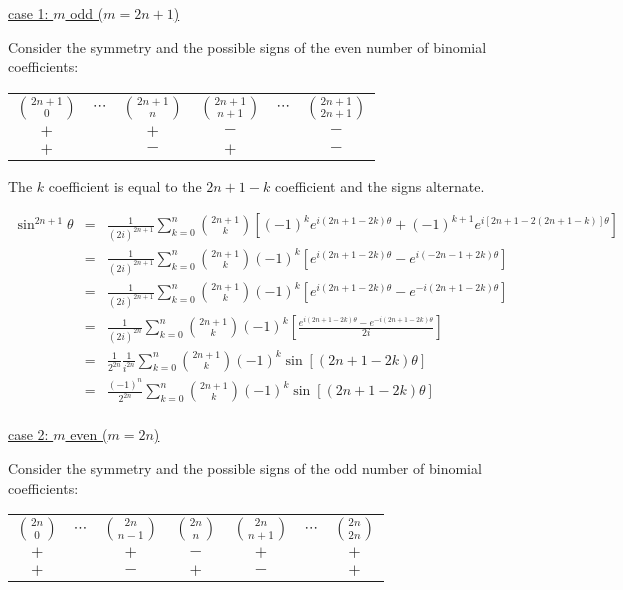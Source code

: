 \documentclass[letterpaper,12pt,fleqn]{article}
\renewcommand{\o}{\theta}
\begin{document}
\begin{theproof}
\begin{description}
\item{\underline{case 1: $m$ odd ($m=2n+1$)}}

Consider the symmetry and the possible signs of the even number of binomial
coefficients:

\begin{tabular}{cccccc}
$\binom{2n+1}{0}$ & $\cdots$ & $\binom{2n+1}{n}$ &
    $\binom{2n+1}{n+1}$ & $\cdots$ & $\binom{2n+1}{2n+1}$ \\
$+$ & & $+$ & $-$ & & $-$ \\
$+$ & & $-$ & $+$ & & $-$ \\
\end{tabular}

The $k$ coefficient is equal to the $2n+1-k$ coefficient and the signs
alternate.

\begin{eqnarray*}
\sin^{2n+1}\o &=& \frac{1}{(2i)^{2n+1}}\sum_{k=0}^n\binom{2n+1}{k}
        \left[(-1)^ke^{i(2n+1-2k)\o}+(-1)^{k+1}e^{i[2n+1-2(2n+1-k)]\o}\right] \\
    &=&  \frac{1}{(2i)^{2n+1}}\sum_{k=0}^n\binom{2n+1}{k}(-1)^k
        \left[e^{i(2n+1-2k)\o}-e^{i(-2n-1+2k)\o}\right] \\
    &=& \frac{1}{(2i)^{2n+1}}\sum_{k=0}^n\binom{2n+1}{k}(-1)^k
        \left[e^{i(2n+1-2k)\o}-e^{-i(2n+1-2k)\o}\right] \\
    &=& \frac{1}{(2i)^{2n}}\sum_{k=0}^n\binom{2n+1}{k}(-1)^k
        \left[\frac{e^{i(2n+1-2k)\o}-e^{-i(2n+1-2k)\o}}{2i}\right] \\
    &=& \frac{1}{2^{2n}}\frac{1}{i^{2n}}\sum_{k=0}^n\binom{2n+1}{k}(-1)^k
        \sin[(2n+1-2k)\o] \\
    &=& \frac{(-1)^n}{2^{2n}}\sum_{k=0}^n\binom{2n+1}{k}(-1)^k
        \sin[(2n+1-2k)\o] \\
\end{eqnarray*}

\item{\underline{case 2: $m$ even ($m=2n$)}}

Consider the symmetry and the possible signs of the odd number of binomial
coefficients:

\begin{tabular}{ccccccc}
$\binom{2n}{0}$ & $\cdots$ & $\binom{2n}{n-1}$ & $\binom{2n}{n}$ &
    $\binom{2n}{n+1}$ & $\cdots$ & $\binom{2n}{2n}$ \\
$+$ & & $+$ & $-$ & $+$ & & $+$ \\
$+$ & & $-$ & $+$ & $-$ & & $+$ \\
\end{tabular}


\end{description}
\end{theproof}
\end{document}
